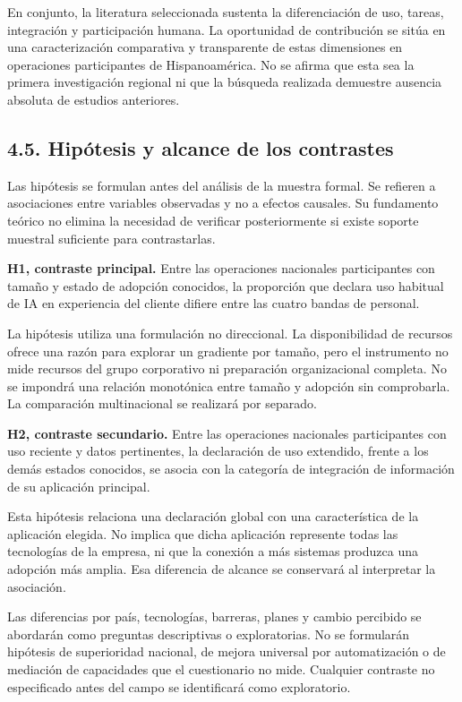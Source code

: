 \documentclass[12pt,letterpaper]{article}
\begin{document}
En conjunto, la literatura seleccionada sustenta la diferenciación de uso, tareas, integración y participación humana. La oportunidad de contribución se sitúa en una caracterización comparativa y transparente de estas dimensiones en operaciones participantes de Hispanoamérica. No se afirma que esta sea la primera investigación regional ni que la búsqueda realizada demuestre ausencia absoluta de estudios anteriores.

\subsection*{4.5. Hipótesis y alcance de los contrastes}
Las hipótesis se formulan antes del análisis de la muestra formal. Se refieren a asociaciones entre variables observadas y no a efectos causales. Su fundamento teórico no elimina la necesidad de verificar posteriormente si existe soporte muestral suficiente para contrastarlas.

\textbf{H1, contraste principal.} Entre las operaciones nacionales participantes con tamaño y estado de adopción conocidos, la proporción que declara uso habitual de IA en experiencia del cliente difiere entre las cuatro bandas de personal.

La hipótesis utiliza una formulación no direccional. La disponibilidad de recursos ofrece una razón para explorar un gradiente por tamaño, pero el instrumento no mide recursos del grupo corporativo ni preparación organizacional completa. No se impondrá una relación monotónica entre tamaño y adopción sin comprobarla. La comparación multinacional se realizará por separado.

\textbf{H2, contraste secundario.} Entre las operaciones nacionales participantes con uso reciente y datos pertinentes, la declaración de uso extendido, frente a los demás estados conocidos, se asocia con la categoría de integración de información de su aplicación principal.

Esta hipótesis relaciona una declaración global con una característica de la aplicación elegida. No implica que dicha aplicación represente todas las tecnologías de la empresa, ni que la conexión a más sistemas produzca una adopción más amplia. Esa diferencia de alcance se conservará al interpretar la asociación.

Las diferencias por país, tecnologías, barreras, planes y cambio percibido se abordarán como preguntas descriptivas o exploratorias. No se formularán hipótesis de superioridad nacional, de mejora universal por automatización o de mediación de capacidades que el cuestionario no mide. Cualquier contraste no especificado antes del campo se identificará como exploratorio.
\end{document}
